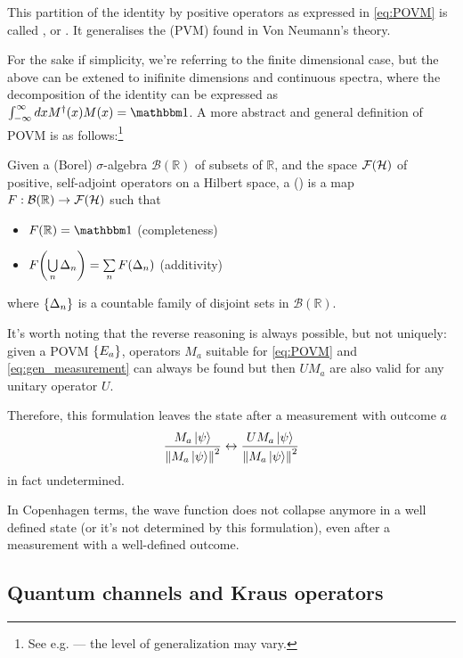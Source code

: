 This partition of the identity by positive operators
as expressed in \eqref{eq:POVM} is called
, or .
It generalises the  (PVM)
found in Von Neumann's theory.

For the sake if simplicity, we're referring to the finite dimensional case,
but the above can be extened to inifinite dimensions and continuous spectra,
where the decomposition of the identity can be expressed as
$\int_{-\infty}^{\infty} dx M^{\dagger}(x)M(x) = \idop $.
A more abstract and general definition of POVM is as
follows:\footnote{
  See e.g. \cite{BeneduciPhD, Berberian} --- the level of generalization may vary.
}
\begin{definition}
  Given a (Borel) $\sigma$-algebra $\mathcal{B}(\mathbb{R})$ of subsets of $\mathbb{R}$,
  and the space $\mathcal{F}(\mathcal{H})$ of positive, self-adjoint operators on a Hilbert space,
  a  ()
  is a map $F: \mathcal{B}(\mathbb{R}) \rightarrow \mathcal{F}(\mathcal{H})$
  such that
  \begin{itemize}
    \item $F(\mathbb{R}) = \idop$ (completeness)
    \item $F\qty(\bigcup\limits_{n} \Delta_n) = \sum\limits_{n} F\qty(\Delta_n)$ (additivity) 
  \end{itemize}
  where $\left\{\Delta_n\right\}$ is a countable family of disjoint sets in
  $\mathcal{B}(\mathbb{R})$.
\end{definition}

It's worth noting that the reverse reasoning is always possible,
but not uniquely:
given a POVM $\left\{E_a\right\}$, operators $M_a$
suitable for \eqref{eq:POVM} and \eqref{eq:gen_measurement}
can always be found \parencite[Sec. 3.1]{PreskillNotes}
but then
$UM_a$ are also valid
for any unitary operator $U$.

Therefore, this formulation leaves the state after a measurement
with outcome $a$
\[
  \frac{M_a\ket{\psi}}{\norm{M_a\ket{\psi}}^2}
  \leftrightarrow
  \frac{UM_a\ket{\psi}}{\norm{M_a\ket{\psi}}^2}
\]
in fact undetermined.

In Copenhagen terms, the wave function does not collapse anymore
in a well defined state
(or it's not determined by this formulation),
even after a measurement with a
well-defined outcome.

\subsection{Quantum channels and Kraus operators}

